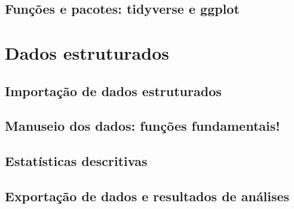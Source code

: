 \documentclass{article}
\begin{document}
\subsection{Funções e pacotes: tidyverse e ggplot}

\section{Dados estruturados}
\subsection{Importação de dados estruturados}
\subsection{Manuseio dos dados: funções fundamentais!}
\subsection{Estatísticas descritivas}
\subsection{Exportação de dados e resultados de análises}
\end{document}
